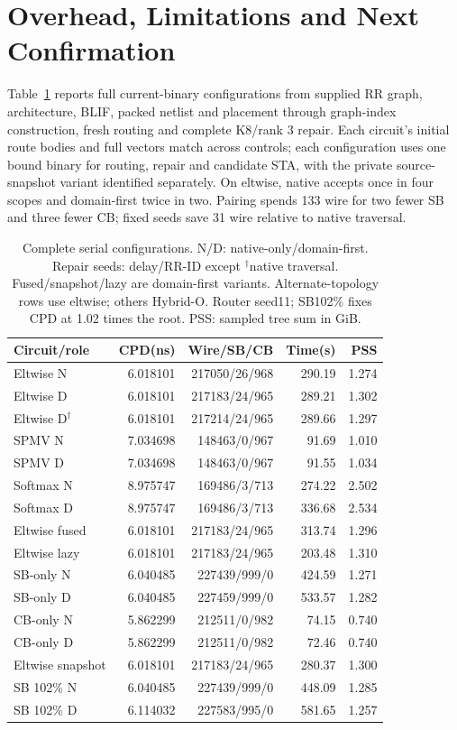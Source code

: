 \documentclass[conference,10pt]{IEEEtran}
\begin{document}
\section{Overhead, Limitations and Next Confirmation}
Table~\ref{tab:completecost} reports full current-binary configurations from supplied RR graph, architecture, BLIF, packed netlist and placement through graph-index construction, fresh routing and complete K8/rank 3 repair. Each circuit's initial route bodies and full vectors match across controls; each configuration uses one bound binary for routing, repair and candidate STA, with the private source-snapshot variant identified separately. On eltwise, native accepts once in four scopes and domain-first twice in two. Pairing spends 133 wire for two fewer SB and three fewer CB; fixed seeds save 31 wire relative to native traversal.
\begin{table}[t]
\centering\footnotesize\setlength{\tabcolsep}{3pt}
\caption{Complete serial configurations. N/D: native-only/domain-first. Repair seeds: delay/RR-ID except $^\dagger$native traversal. Fused/snapshot/lazy are domain-first variants. Alternate-topology rows use eltwise; others Hybrid-O. Router seed11; SB102\% fixes CPD at 1.02 times the root. PSS: sampled tree sum in GiB.}
\label{tab:completecost}
\begin{tabular}{lrrrr}\hline
Circuit/role & CPD(ns) & Wire/SB/CB & Time(s) & PSS\\\hline
Eltwise N&6.018101&217050/26/968&290.19&1.274\\
Eltwise D&6.018101&217183/24/965&289.21&1.302\\
Eltwise D$^\dagger$&6.018101&217214/24/965&289.66&1.297\\
SPMV N&7.034698&148463/0/967&91.69&1.010\\
SPMV D&7.034698&148463/0/967&91.55&1.034\\
Softmax N&8.975747&169486/3/713&274.22&2.502\\
Softmax D&8.975747&169486/3/713&336.68&2.534\\
Eltwise fused&6.018101&217183/24/965&313.74&1.296\\
Eltwise lazy&6.018101&217183/24/965&203.48&1.310\\
SB-only N&6.040485&227439/999/0&424.59&1.271\\
SB-only D&6.040485&227459/999/0&533.57&1.282\\
CB-only N&5.862299&212511/0/982&74.15&0.740\\
CB-only D&5.862299&212511/0/982&72.46&0.740\\
Eltwise snapshot&6.018101&217183/24/965&280.37&1.300\\
SB 102\% N&6.040485&227439/999/0&448.09&1.285\\
SB 102\% D&6.114032&227583/995/0&581.65&1.257\\\hline
\end{tabular}
\end{table}
\end{document}
